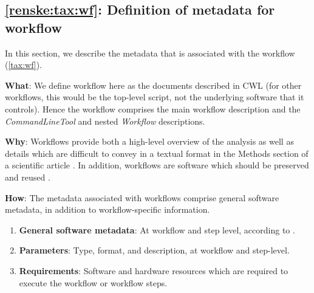 \subsection{\ref{renske:tax:wf}: Definition of metadata for workflow}
\label{sec:renske:wf_reqs}

In this section, we describe the metadata that is associated with the workflow (\ref{tax:wf}). 

\textbf{What}: We define workflow here as the documents described in CWL (for other workflows, this would be the top-level script, not the underlying software that it controls). Hence the workflow comprises the main workflow description and the \emph{CommandLineTool} and nested \emph{Workflow} descriptions. 

\textbf{Why}: Workflows provide both a high-level overview of the analysis as well as details which are difficult to convey in a textual format in the Methods section of a scientific article \cite{gilAutomatingDataNarratives2017}. In addition, workflows are software which should be preserved and reused \cite{Goble2020}. 

\textbf{How}: The metadata associated with workflows comprise general software metadata, in addition to workflow-specific information. 
\begin{enumerate}[label=\textbf{WF\arabic*}]
\item \textbf{General software metadata}: At workflow and step level, according to . \label{renske:req:wf_all}
\item \textbf{Parameters}: Type, format, and description, at workflow and step-level. \label{renske:req:wf_param}
\item \textbf{Requirements}: Software and hardware resources which are required to execute the workflow or workflow steps. \label{renske:req:wf_resources}
\end{enumerate}
